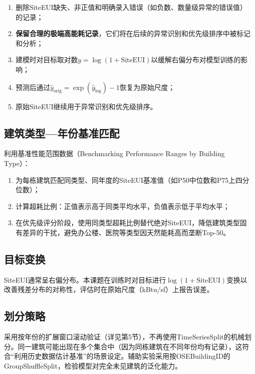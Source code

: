 \begin{enumerate}
    \item 删除SiteEUI缺失、非正值和明确录入错误（如负数、数量级异常的错误值）的记录；
    \item \textbf{保留合理的极端高能耗记录}，它们将在后续的异常识别和优先级排序中被标记和分析；
    \item 建模时对目标取对数$y = \log(1+\text{SiteEUI})$以缓解右偏分布对模型训练的影响；
    \item 预测后通过$\hat{y}_{\text{orig}} = \exp(\hat{y}_{\text{log}}) - 1$恢复为原始尺度；
    \item 原始SiteEUI继续用于异常识别和优先级排序。
\end{enumerate}

\subsection{建筑类型—年份基准匹配}

利用基准性能范围数据（Benchmarking Performance Ranges by Building Type）：

\begin{enumerate}
    \item 为每栋建筑匹配同类型、同年度的SiteEUI基准值（如P50中位数和P75上四分位数）；
    \item 计算超耗比例：正值表示高于同类平均水平，负值表示低于平均水平；
    \item 在优先级评分阶段，使用同类型超耗比例替代绝对SiteEUI，降低建筑类型固有差异的干扰，避免办公楼、医院等类型因天然能耗高而垄断Top-50。
\end{enumerate}

\subsection{目标变换}

SiteEUI通常呈右偏分布。本课题在训练时对目标进行$\log(1+\text{SiteEUI})$变换以改善残差分布的对称性，评估时在原始尺度（kBtu/sf）上报告误差。

\subsection{划分策略}

采用按年份的扩展窗口滚动验证（详见第5节），不再使用TimeSeriesSplit的机械划分。同一建筑可能出现在多个集合中（因为同栋建筑在不同年份均有记录），这符合``利用历史数据估计基准''的场景设定。辅助实验采用按OSEBuildingID的GroupShuffleSplit，检验模型对完全未见建筑的泛化能力。

